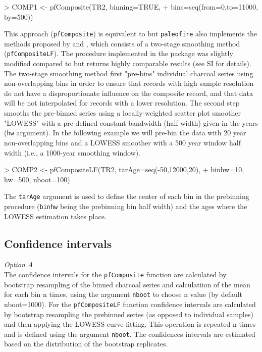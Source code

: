 \documentclass{elsarticle}
\begin{document}
\begin{Schunk}
\begin{Sinput}
> COMP1 <- pfComposite(TR2, binning=TRUE, 
+                      bins=seq(from=0,to=11000, by=500))
\end{Sinput}
\end{Schunk}

This approach (\texttt{pfComposite}) is equivalent to \citet{Power2008} but \texttt{paleofire} also implements the methods proposed by \citet{Marlon2008} and \citet{Daniau2012}, which consists of a two-stage smoothing method (\texttt{pfCompositeLF}). The procedure implemented in the package was slightly modified compared to \citet{Marlon2008} but returns highly comparable results (see SI for details). The two-stage smoothing method first "pre-bins" individual charcoal series using non-overlapping bins in order to ensure that records with high sample resolution do not have a disproportionate influence on the composite record, and that data will be not interpolated for records with a lower resolution. The second step smooths the pre-binned series using a locally-weighted scatter plot smoother "LOWESS" \citep{Cleveland1979} with a pre-defined constant bandwidth (half-width) given in the years (\texttt{hw} argument). In the following example we will pre-bin the data with 20 year non-overlapping bins and a LOWESS smoother with a 500 year window half width (i.e., a 1000-year smoothing window).

\begin{Schunk}
\begin{Sinput}
> COMP2 <- pfCompositeLF(TR2, tarAge=seq(-50,12000,20), 
+                        binhw=10, hw=500, nboot=100)
\end{Sinput}
\end{Schunk}

The \texttt{tarAge} argument is used to define the center of each bin in the prebinning procedure (\texttt{binhw} being the prebinning bin half width) and the ages where the LOWESS estimation takes place.  

\subsection{Confidence intervals}

\textit{Option A}\\
The confidence intervals for the \texttt{pfComposite} function are calculated by bootstrap resampling of the binned charcoal series and calculatiion of the mean for each bin n times, using the argument \texttt{nboot} to choose n value (by default nboot=1000). For the \texttt{pfCompositeLF} function confidence intervals are calculated by bootstrap resampling the prebinned series (as opposed to individual samples) and then applying the LOWESS curve fitting. This operation is repeated n times and is defined using the argument \texttt{nboot}. The confidences intervals are estimated based on the distribution of the bootstrap replicates.
\end{document}
